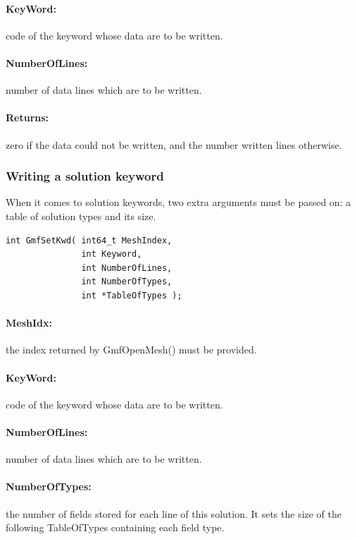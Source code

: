 \documentclass[a4paper,12pt]{article}
\begin{document}
\paragraph{KeyWord:} code of the keyword whose data are to be written.

\paragraph{NumberOfLines:} number of data lines which are to be written.

\paragraph{Returns:} zero if the data could not be written, and the number written lines otherwise.

\subsubsection{Writing a solution keyword}
When it comes to solution keywords, two extra arguments must be passed on: a table of solution types and its size.

\begin{tt}
\begin{verbatim}
int GmfSetKwd( int64_t MeshIndex,
               int Keyword,
               int NumberOfLines,
               int NumberOfTypes,
               int *TableOfTypes );
\end{verbatim}
\end{tt}
\normalfont

\paragraph{MeshIdx:}
the index returned by GmfOpenMesh() must be provided.

\paragraph{KeyWord:} code of the keyword whose data are to be written.

\paragraph{NumberOfLines:} number of data lines which are to be written.

\paragraph{NumberOfTypes:} the number of fields stored for each line of this solution. It sets the size of the following TableOfTypes containing each field type.
\end{document}
